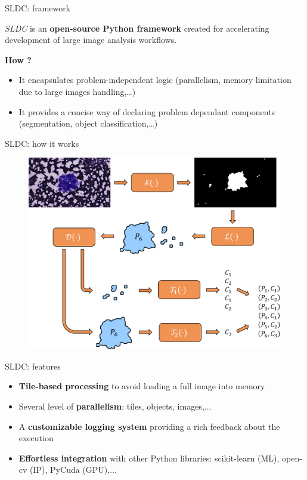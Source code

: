 \documentclass{beamer}
\begin{document}
\begin{frame}{SLDC: framework}

	\textit{SLDC} is an \textbf{open-source Python framework} created for accelerating development of large image analysis workflows. 
	
	\vfill

	\textbf{How ?}
	\begin{itemize}

		\item It encapsulates problem-independent logic (parallelism, memory limitation due to large images handling,…)

		\item It provides a concise way of declaring problem dependant components (segmentation, object classification,…)

	\end{itemize}

\end{frame}


\begin{frame}{SLDC: how it works}
	\begin{figure}
		\includegraphics[scale=0.45]{images/workflow_illustration.png}
	\end{figure}
\end{frame}


\begin{frame}{SLDC: features}
	\begin{itemize}
	
		\item \textbf{Tile-based processing} to avoid loading a full image into memory
		
		\item Several level of \textbf{parallelism}: tiles, objects, images,...
		
		\item A \textbf{customizable logging system} providing a rich feedback about the execution
		
		\item \textbf{Effortless integration} with other Python libraries: scikit-learn (ML), open-cv (IP), PyCuda (GPU),...
		
		
	\end{itemize}
\end{frame}
\end{document}
